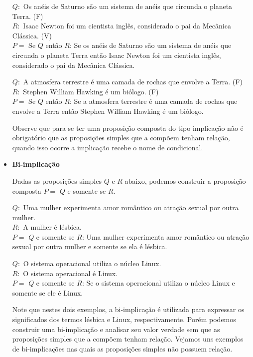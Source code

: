 \begin{itemize}
 \begin{exem} \label{(Se 3)}
 $Q:$ Os anéis de Saturno são um sistema de anéis que circunda o planeta Terra. (F) \\
 $R:$ Isaac Newton foi um cientista inglês, considerado o pai da Mecânica Clássica. (V) \\
 $P=$ Se $Q$ então $R$: Se os anéis de Saturno são um sistema de anéis que circunda o planeta Terra então Isaac Newton foi um cientista inglês, considerado o pai da Mecânica Clássica.
 \end{exem}

 \begin{exem} \label{(Se 4)}
 $Q:$ A atmosfera terrestre é uma camada de rochas que envolve a Terra. (F) \\
 $R:$ Stephen William Hawking é um biólogo. (F) \\
 $P=$ Se $Q$ então $R$: Se a atmosfera terrestre é uma camada de rochas que envolve a Terra então Stephen William Hawking é um biólogo.
 \end{exem}


 Observe que para se ter uma proposição composta do tipo implicação não é obrigatório que as proposições simples que a compõem tenham relação, quando isso ocorre a implicação recebe o nome de condicional.

 \item \textbf{Bi-implicação}

 Dadas as proposições simples $Q$ e $R$ abaixo, podemos construir a proposição composta $P=$ $Q$ e somente se $R$.

  \begin{exem} \label{(Def 1)}
  $Q:$ Uma mulher experimenta amor romântico ou atração sexual por outra mulher.\\
 $R:$ A mulher é lésbica. \\
 $P=$ $Q$ e somente se $R$: Uma mulher experimenta amor romântico ou atração sexual por outra mulher e somente se ela é lésbica.
 \end{exem}

 \begin{exem} \label{(Def 2)}
 $Q:$ O sistema operacional utiliza o núcleo Linux. \\
 $R:$ O sistema operacional é Linux. \\
 $P=$ $Q$ e somente se $R$: Se o sistema operacional utiliza o núcleo Linux e somente se ele é Linux.
 \end{exem}

 Note que nestes dois exemplos, a bi-implicação é utilizada para expressar os significados dos termos lésbica e Linux, respectivamente. Porém podemos construir uma bi-implicação e analisar seu valor verdade sem que as proposições simples que a compõem tenham relação. Vejamos uns exemplos de bi-implicações nas quais as proposições simples não possuem relação.



\end{itemize}
